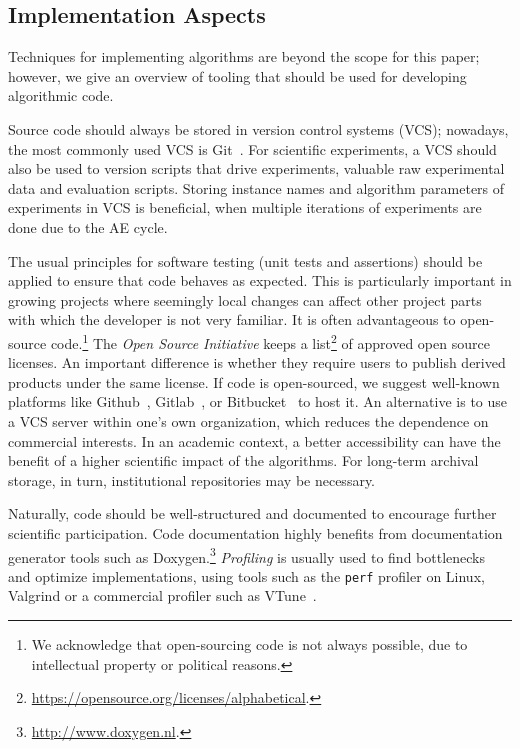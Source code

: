 \documentclass[algorithms,article,submit,moreauthors,pdftex]{Definitions/mdpi}
\begin{document}
\subsection{Implementation Aspects}
\label{sub:implementation}
%
	Techniques for implementing algorithms are beyond the scope for
	this paper; however, we give an overview of tooling that should be
	used for developing algorithmic code.

	Source code should always be stored in version control systems (VCS);
  nowadays, the most commonly used VCS is Git~\cite{git}. For	scientific experiments, a VCS should also be used to version scripts that
	drive experiments, valuable raw experimental data and evaluation scripts.
	Storing instance names and algorithm parameters of experiments in VCS is
	beneficial, \eg when multiple iterations of experiments are done
	due to the AE cycle.

	The usual principles for software testing
	(\eg unit tests and assertions) should be applied to ensure that code behaves as expected.
	This is particularly important in growing projects where seemingly local changes can affect other project parts with which the developer is not very familiar.
	It is often advantageous to open-source code.\footnote{We acknowledge that open-sourcing code is
		not always possible, \eg due to intellectual property or political reasons.}
		The \emph{Open Source Initiative} keeps a list\footnote{\url{https://opensource.org/licenses/alphabetical}.} of approved open source licenses.
		An important difference is whether they require users to publish derived products under the same license.
		If code is open-sourced, we suggest well-known platforms
		like Github~\cite{github}, Gitlab~\cite{gitlab}, or Bitbucket~\cite{bitbucket} to host it.
		An alternative is to use a VCS server within one's own organization, which reduces
		the dependence on commercial interests.
	In an academic context, a better accessibility can have the benefit of a higher scientific impact of the algorithms.
		For long-term archival storage, in turn, institutional repositories may be necessary.

	        Naturally, code should be well-structured and documented to encourage further scientific participation.
                Code documentation highly benefits from documentation generator
                tools such as Doxygen.\footnote{\url{http://www.doxygen.nl}.}
	\emph{Profiling} is usually used to find bottlenecks and optimize
	implementations, \eg using tools such as the \texttt{perf} profiler on Linux, Valgrind \cite{nethercote2007valgrind} or a commercial profiler such as VTune~\cite{reinders2005vtune}.
\end{document}

